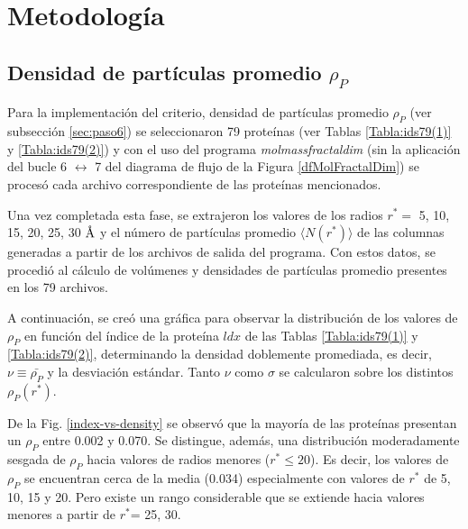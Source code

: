  	
 	\section{Metodolog\'{i}a}
 	
 	\subsection{Densidad de partículas promedio $\rho_{P}$}
 	\label{sec:dpp}
 	
 	Para la implementación del criterio, densidad de partículas 
 	promedio $\rho_{P}$ (ver subsección \ref{sec:paso6}) se seleccionaron 
 	79 proteínas (ver Tablas \ref{Tabla:ids79(1)} y \ref{Tabla:ids79(2)}) y con el uso del programa \emph{molmassfractaldim} (sin la aplicación del bucle 6 $\longleftrightarrow$ 7 del diagrama de flujo de la Figura \ref{dfMolFractalDim}) se procesó cada archivo correspondiente de las proteínas mencionados. 
 
 	Una vez completada esta fase, se extrajeron los valores de los radios $r^*{=}$ 5, 10, 15, 20, 25, 30 $\textup{\r{A}}$ y el número de partículas promedio $\langle N(r^{*}) \rangle$  de las columnas generadas a partir de los archivos de salida del programa. Con estos datos, se procedió al cálculo de volúmenes y densidades de partículas promedio presentes en los 79 archivos. 
 	
 	
 	A continuación, se creó una gráfica para observar la distribución de los valores de $\rho_{P}$ en funci\'{o}n del \'{i}ndice de la prote\'{i}na $ldx$ de las Tablas \ref{Tabla:ids79(1)} y \ref{Tabla:ids79(2)}, determinando la densidad doblemente promediada, es decir, $\nu\equiv\bar{\rho_P}$ y la desviaci\'{o}n est\'{a}ndar. Tanto $\nu$ como $\sigma$ se calcularon sobre los distintos $\rho_P(r^*)$.
 	
 	De la Fig. \ref{index-vs-density} se observó que la mayor\'{i}a de las prote\'{i}nas presentan un $\rho_P$ entre 0.002 y 0.070. 
 	Se distingue, además, una distribución moderadamente sesgada de $\rho_P$ hacia valores de radios menores ($r^* \leq 20$). Es decir, los valores de \(\rho_P\) se encuentran cerca de la media (0.034) especialmente con valores de $r^*$ de 5, 10, 15 y 20. Pero existe un rango considerable que se extiende hacia valores menores a partir de $r^*$= 25, 30.
 	


